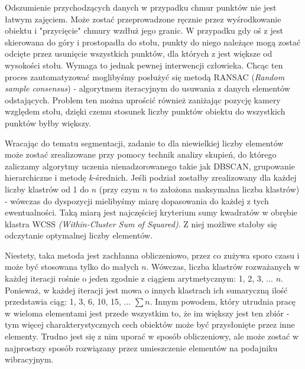 \documentclass{article}
\begin{document}
Odszumienie przychodzących danych w przypadku chmur punktów nie jest łatwym zajęciem. Może zostać przeprowadzone ręcznie przez wyśrodkowanie obiektu i "przycięcie" chmury wzdłuż jego granic. W przypadku gdy oś z jest skierowana do góry i prostopadła do stołu, punkty do niego należące mogą zostać odcięte przez usunięcie wszystkich punktów, dla których z jest większe od wysokości stołu. Wymaga to jednak pewnej interwencji człowieka. Chcąc ten proces zautomatyzować moglibyśmy posłużyć się metodą RANSAC (\emph{Random sample consensus}) - algorytmem iteracyjnym do usuwania z danych elementów odstających. Problem ten można uprościć również zaniżając pozycję kamery względem stołu, dzięki czemu stosunek liczby punktów obiektu do wszystkich punktów byłby większy. 

Wracając do tematu segmentacji, zadanie to dla niewielkiej liczby elementów może zostać zrealizowane przy pomocy technik analizy skupień, do którego zaliczamy algorytmy uczenia nienadzorowanego takie jak DBSCAN, grupowanie hierarchiczne i metodę $k$-średnich. Jeśli podział zostałby zrealizowany dla każdej liczby klastrów od 1 do $n$ (przy czym $n$ to założona maksymalna liczba klastrów) - wówczas do dyspozycji mielibyśmy miarę dopasowania do każdej z tych ewentualności. Taką miarą jest najczęściej kryterium sumy kwadratów w obrębie klastra WCSS \emph{(Within-Cluster Sum of Squared)}. Z niej możliwe stałoby się odczytanie optymalnej liczby elementów. 

Niestety, taka metoda jest zachłanna obliczeniowo, przez co zużywa sporo czasu i może być stosowana tylko do małych $n$. Wówczas, liczba klastrów rozważanych w każdej iteracji rośnie o jeden zgodnie z ciągiem arytmetycznym: 1, 2, 3, ... $n$. Ponieważ, w każdej iteracji jest mowa o innych klastrach ich sumaryczną ilość przedstawia ciąg: 1, 3, 6, 10, 15, ... $\sum n$. Innym powodem, który utrudnia pracę w wieloma elementami jest przede wszystkim to, że im większy jest ten zbiór - tym więcej charakterystycznych cech obiektów może być przysłonięte przez inne elementy. Trudno jest się z nim uporać w sposób obliczeniowy, ale może zostać w najprostszy sposób rozwiązany przez umieszczenie elementów na podajniku wibracyjnym.
\end{document}
